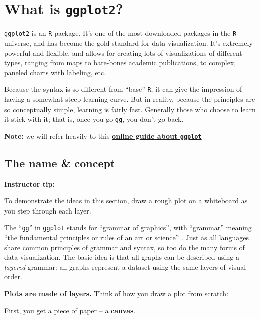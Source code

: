 \documentclass[]{book}
\begin{document}
\hypertarget{what-is-ggplot2}{%
\section*{\texorpdfstring{What is \texttt{ggplot2}?}{What is ggplot2?}}\label{what-is-ggplot2}}

\texttt{ggplot2} is an \texttt{R} package. It's one of the most downloaded packages in the \texttt{R} universe, and has become the gold standard for data visualization. It's extremely powerful and flexible, and allows for creating lots of visualizations of different types, ranging from maps to bare-bones academic publications, to complex, paneled charts with labeling, etc.

Because the syntax is so different from ``base'' \texttt{R}, it can give the impression of having a somewhat steep learning curve. But in reality, because the principles are so conceptually simple, learning is fairly fast. Generally those who choose to learn it stick with it; that is, once you go \texttt{gg}, you don't go back.

\textbf{Note:} we will refer heavily to this \href{https://ggplot2-book.org/introduction.html}{\textbf{online guide about \texttt{ggplot}}}

\hypertarget{the-name-concept}{%
\subsection*{The name \& concept}\label{the-name-concept}}

\leavevmode\hypertarget{tip-text}{}%
\textbf{Instructor tip:}

To demonstrate the ideas in this section, draw a rough plot on a whiteboard as you step through each layer.

The ``\texttt{gg}'' in \texttt{ggplot} stands for ``grammar of graphics'', with ``grammar'' meaning ``the fundamental principles or rules of an art or science'' \citep{layered-grammar}. Just as all languages share common principles of grammar and syntax, so too do the many forms of data visualization. The basic idea is that all graphs can be described using a \emph{layered} grammar: all graphs represent a dataset using the same layers of visual order.

\textbf{Plots are made of layers.} Think of how you draw a plot from scratch:

First, you get a piece of paper -- a \textbf{canvas}.
\end{document}
